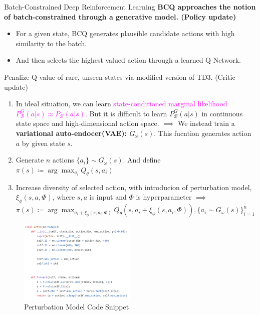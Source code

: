 \documentclass[11pt]{beamer}
\newcommand{\mc}[1]{\mathcal{#1}}
\newcommand{\tb}[1]{\textbf{#1}}
\begin{document}
\begin{frame}{Batch-Constrained Deep Reinforcement Learning}
    \tb{BCQ approaches the notion of batch-constrained through a generative model. (Policy update)}
    \begin{itemize}
        \item For a given state, BCQ generates plausible candidate actions with high similarity to the batch.
        \item And then selects the highest valued action through a learned Q-Network.
    \end{itemize}

    Penalize Q value of rare, unseen states via modified version of TD3. (Critic update)
    \bigskip

    \vfill

    \begin{enumerate}
        \item In ideal situation, we can learn \textcolor{magenta}{state-conditioned marginal likelihood $P^G_\mc{B}(a|s) \approx P_{\mc{B}}(a|s)$}.
        But it is difficult to learn $P^G_\mc{B}(a|s)$ in continuous state space and high-dimensional action space.
        $\implies$ We instead train a \tb{variational auto-endocer(VAE): $G_\omega (s)$}. This fucntion generates action $a$ by given state $s$.
        \item Generate $n$ actions $\{a_i\} \sim G_\omega (s)$.
        And define $\pi(s) \coloneqq \arg \max_{a_i} Q_\theta (s, a_i)$
        \item Increase diversity of selected action, with introducion of perturbation model, $\xi_\phi(s,a,\Phi)$, where $s,a$ is input and $\Phi$ is hyperparameter
        $\implies$ $\pi(s) \coloneqq \arg \max_{a_i + \xi_\phi(s,a_i, \Phi)} Q_\theta (s,a_i + \xi_\phi (s,a_i, \Phi)), \{a_i \sim G_\omega(s)\}_{i=1}^n$

    \end{enumerate}

    \begin{figure}
        \centering
        \includegraphics[width=0.5\textwidth]{Actor.png}
        \caption{Perturbation Model Code Snippet}
    \end{figure}
\end{frame}
\end{document}

